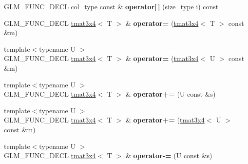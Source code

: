 \begin{DoxyCompactItemize}
\item 
\hypertarget{structglm_1_1detail_1_1tmat3x4_a7dc21a8cdc3498009633e48e4b97a103}{}G\+L\+M\+\_\+\+F\+U\+N\+C\+\_\+\+D\+E\+C\+L \hyperlink{structglm_1_1detail_1_1tvec4}{col\+\_\+type} const \& {\bfseries operator\mbox{[}$\,$\mbox{]}} (size\+\_\+type i) const \label{structglm_1_1detail_1_1tmat3x4_a7dc21a8cdc3498009633e48e4b97a103}

\item 
\hypertarget{structglm_1_1detail_1_1tmat3x4_af9f94eb464f772e0a67f29e87bb70fd4}{}G\+L\+M\+\_\+\+F\+U\+N\+C\+\_\+\+D\+E\+C\+L \hyperlink{structglm_1_1detail_1_1tmat3x4}{tmat3x4}$<$ T $>$ \& {\bfseries operator=} (\hyperlink{structglm_1_1detail_1_1tmat3x4}{tmat3x4}$<$ T $>$ const \&m)\label{structglm_1_1detail_1_1tmat3x4_af9f94eb464f772e0a67f29e87bb70fd4}

\item 
\hypertarget{structglm_1_1detail_1_1tmat3x4_a3fd57a85c46c046df5968b92f31f7119}{}{\footnotesize template$<$typename U $>$ }\\G\+L\+M\+\_\+\+F\+U\+N\+C\+\_\+\+D\+E\+C\+L \hyperlink{structglm_1_1detail_1_1tmat3x4}{tmat3x4}$<$ T $>$ \& {\bfseries operator=} (\hyperlink{structglm_1_1detail_1_1tmat3x4}{tmat3x4}$<$ U $>$ const \&m)\label{structglm_1_1detail_1_1tmat3x4_a3fd57a85c46c046df5968b92f31f7119}

\item 
\hypertarget{structglm_1_1detail_1_1tmat3x4_a34ad07821ef734e30238c6ed41cf46e6}{}{\footnotesize template$<$typename U $>$ }\\G\+L\+M\+\_\+\+F\+U\+N\+C\+\_\+\+D\+E\+C\+L \hyperlink{structglm_1_1detail_1_1tmat3x4}{tmat3x4}$<$ T $>$ \& {\bfseries operator+=} (U const \&s)\label{structglm_1_1detail_1_1tmat3x4_a34ad07821ef734e30238c6ed41cf46e6}

\item 
\hypertarget{structglm_1_1detail_1_1tmat3x4_ac16e51e1eae4d6f74d292d182df2384f}{}{\footnotesize template$<$typename U $>$ }\\G\+L\+M\+\_\+\+F\+U\+N\+C\+\_\+\+D\+E\+C\+L \hyperlink{structglm_1_1detail_1_1tmat3x4}{tmat3x4}$<$ T $>$ \& {\bfseries operator+=} (\hyperlink{structglm_1_1detail_1_1tmat3x4}{tmat3x4}$<$ U $>$ const \&m)\label{structglm_1_1detail_1_1tmat3x4_ac16e51e1eae4d6f74d292d182df2384f}

\item 
\hypertarget{structglm_1_1detail_1_1tmat3x4_aabdd4dd5d7d0037d515833961ac0a72c}{}{\footnotesize template$<$typename U $>$ }\\G\+L\+M\+\_\+\+F\+U\+N\+C\+\_\+\+D\+E\+C\+L \hyperlink{structglm_1_1detail_1_1tmat3x4}{tmat3x4}$<$ T $>$ \& {\bfseries operator-\/=} (U const \&s)\label{structglm_1_1detail_1_1tmat3x4_aabdd4dd5d7d0037d515833961ac0a72c}


\end{DoxyCompactItemize}
